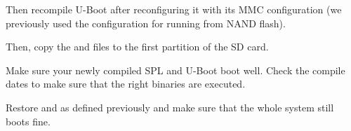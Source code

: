 Then recompile U-Boot after reconfiguring it with its MMC configuration
(we previously used the configuration for running from NAND flash).

Then, copy the  and  files to
the first partition of the SD card.

Make sure your newly compiled SPL and U-Boot boot well. Check
the compile dates to make sure that the right binaries are executed.

Restore  and  as defined previously
and make sure that the whole system still boots fine.
